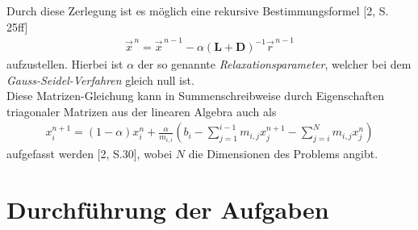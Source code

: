 \documentclass[12pt,a4paper,titlepage,headinclude,bibtotoc]{scrartcl}
\begin{document}
Durch diese Zerlegung ist es möglich eine rekursive Bestimmungsformel [2, S. 25ff]
\begin{align*}
\vec{x}^{\,n} = \vec{x}^{\,n-1} - \alpha(\boldsymbol{L}+\boldsymbol{D})^{-1} \vec{r}^{\,n-1}
\end{align*}
aufzustellen. Hierbei ist $\alpha$ der so genannte \textit{Relaxationsparameter}, welcher bei dem \textit{Gauss-Seidel-Verfahren} gleich null ist.\\
Diese Matrizen-Gleichung kann in Summenschreibweise durch Eigenschaften triagonaler Matrizen aus der linearen Algebra auch als
\begin{align}
\label{eq:sor}
x^{n+1}_i = (1-\alpha)x^{n}_i + \frac{\alpha}{m_{i,i}} \left(b_i - \sum\limits_{j=1}^{i-1} m_{i,j} x^{n+1}_j - \sum\limits_{j=i}^{N} m_{i,j} x^{n}_j \right)  
\end{align}
aufgefasst werden [2, S.30], wobei $N$ die Dimensionen des Problems angibt.

\section{Durchführung der Aufgaben}
\end{document}
